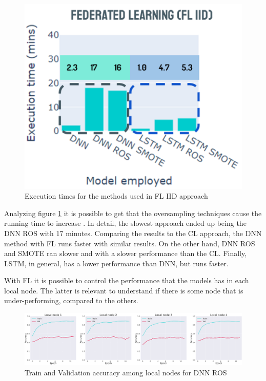 \begin{figure}[H]
\centering
\includegraphics[scale=0.6]{img/times_fl_iid.png}
\caption{Execution times for the methods used in FL IID approach}
\label{fig:times_fl_iid}
\end{figure}

Analyzing figure \ref{fig:times_fl_iid} it is possible to get that the oversampling techniques cause the running time to increase \cite{fl28}. In detail, the slowest approach ended up being the DNN ROS with 17 minutes. Comparing the results to the CL approach, the DNN method with FL runs faster with similar results. On the other hand, DNN ROS and SMOTE ran slower and with a slower performance than the CL. Finally, LSTM, in general, has a lower performance than DNN, but runs faster.

With FL it is possible to control the performance that the models has in each local node. The latter is relevant to understand if there is some node that is under-performing, compared to the others.

\begin{figure}[H]
\centering
\includegraphics[scale=0.4]{img/iid_local_nodes_acc.png}
\caption{Train and Validation accuracy among local nodes for DNN ROS}
\label{fig:iid_local_nodes_acc}
\end{figure}

